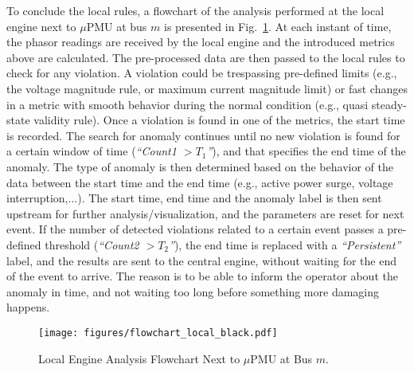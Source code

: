 \documentclass[twocolumn]{IEEEtran}
\newcommand{\mup}{\mu \text{PMU}}
\begin{document}
To conclude the local rules, a flowchart of the analysis performed at the local engine next to $\mup$ at bus $m$ is presented in Fig.~\ref{fig.local_flowchart}. At each instant of time, the phasor readings are received by the local engine and the introduced metrics above are calculated. The pre-processed data are then passed to the local rules to check for any violation. A violation could be trespassing pre-defined limits (e.g., the voltage magnitude rule, or maximum current magnitude limit) or fast changes in a metric with smooth behavior during the normal condition (e.g., quasi steady-state validity rule). Once a violation is found in one of the metrics, the start time is recorded. The search for anomaly continues until no new violation is found for a certain window of time ({\it{``Count1 $>T_1$''}}), and that specifies the end time of the anomaly. The type of anomaly is then determined based on the behavior of the data between the start time and the end time (e.g., active power surge, voltage interruption,...). The start time, end time and the anomaly label is then sent upstream for further analysis/visualization, and the parameters are reset for next event. If the number of detected violations related to a certain event passes a pre-defined threshold ({\it{``Count2 $>T_2$''}}), the end time is replaced with a \textit{``Persistent''} label, and the results are sent to the central engine, without waiting for the end of the event to arrive. The reason is to be able to inform the operator about the anomaly in time, and not waiting too long before something more damaging happens.               
\begin{figure}
\centering
\texttt{[image: figures/flowchart\_local\_black.pdf]}
\caption{Local Engine Analysis Flowchart Next to $\mup$ at Bus $m$.}
\label{fig.local_flowchart}
\end{figure}
\end{document}
